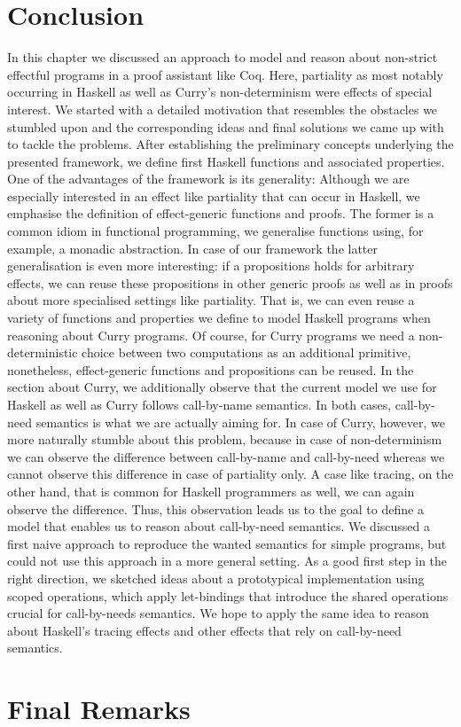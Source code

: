 \section{Conclusion}
\label{sec:conclusion}

In this chapter we discussed an approach to model and reason about
non-strict effectful programs in a proof assistant like Coq.
Here, partiality as most notably occurring in Haskell as well as
Curry's non-determinism were effects of special interest.
We started with a detailed motivation that resembles the obstacles we
stumbled upon and the corresponding ideas and final solutions we came
up with to tackle the problems.
After establishing the preliminary concepts underlying the presented
framework, we define first Haskell functions and associated properties.
One of the advantages of the framework is its generality: Although we
are especially interested in an effect like partiality that can occur
in Haskell, we emphasise the definition of effect-generic functions and
proofs.
The former is a common idiom in functional programming, we generalise
functions using, for example, a monadic abstraction.
In case of our framework the latter generalisation is even more
interesting: if a propositions holds for arbitrary effects, we can
reuse these propositions in other generic proofs as well as in proofs
about more specialised settings like partiality.
That is, we can even reuse a variety of functions and properties we
define to model Haskell programs when reasoning about Curry programs.
Of course, for Curry programs we need a non-deterministic choice
between two computations as an additional primitive, nonetheless,
effect-generic functions and propositions can be reused.
In the section about Curry, we additionally observe that the current
model we use for Haskell as well as Curry follows call-by-name
semantics.
In both cases, call-by-need semantics is what we are actually aiming
for.
In case of Curry, however, we more naturally stumble about this
problem, because in case of non-determinism we can observe the
difference between call-by-name and call-by-need whereas we cannot
observe this difference in case of partiality only.
A case like tracing, on the other hand, that is common for Haskell
programmers as well, we can again observe the difference.
Thus, this observation leads us to the goal to define a model that
enables us to reason about call-by-need semantics.
We discussed a first naive approach to reproduce the wanted semantics
for simple programs, but could not use this approach in a more general
setting.
As a good first step in the right direction, we sketched ideas about a
prototypical implementation using scoped operations, which apply
let-bindings that introduce the shared operations crucial for
call-by-needs semantics.
We hope to apply the same idea to reason about Haskell's tracing
effects and other effects that rely on call-by-need semantics.

\section{Final Remarks}
